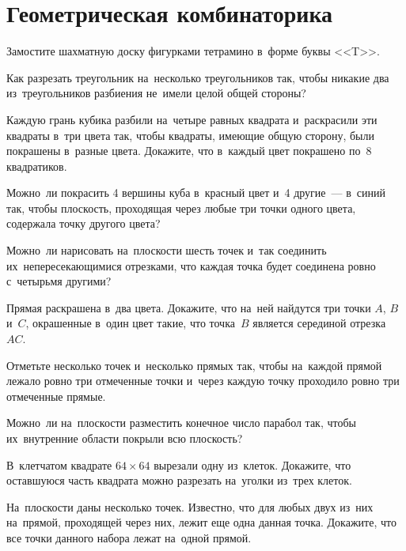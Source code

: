 
\section*{Геометрическая комбинаторика}


\begin{problems}

\item
Замостите шахматную доску фигурками тетрамино в~форме буквы <<\textsf{T}>>.

\item
Как разрезать треугольник на~несколько треугольников так, чтобы никакие два
из~треугольников разбиения не~имели целой общей стороны?

\item
Каждую грань кубика разбили на~четыре равных квадрата и~раскрасили эти квадраты
в~три цвета так, чтобы квадраты, имеющие общую сторону, были покрашены в~разные
цвета.
Докажите, что в~каждый цвет покрашено по~8 квадратиков.

\item
Можно~ли покрасить 4 вершины куба в~красный цвет и~4 другие~--- в~синий так,
чтобы плоскость, проходящая через любые три точки одного цвета, содержала точку
другого цвета?

\item
Можно~ли нарисовать на~плоскости шесть точек и~так соединить
их~непересекающимися отрезками, что каждая точка будет соединена ровно
с~четырьмя другими?

\item
Прямая раскрашена в~два цвета.
Докажите, что на~ней найдутся три точки $A$, $B$ и~$C$, окрашенные в~один цвет
такие, что точка~$B$ является серединой отрезка~$AC$.

\item
Отметьте несколько точек и~несколько прямых так, чтобы на~каждой прямой лежало
ровно три отмеченные точки и~через каждую точку проходило ровно три отмеченные
прямые.

\item
Можно~ли на~плоскости разместить конечное число парабол так, чтобы
их~внутренние области покрыли всю плоскость?

\item
В~клетчатом квадрате $64 \times 64$ вырезали одну из~клеток.
Докажите, что оставшуюся часть квадрата можно разрезать на~уголки из~трех
клеток.

\item
На~плоскости даны несколько точек.
Известно, что для любых двух из~них на~прямой, проходящей через них, лежит еще 
одна данная точка.
Докажите, что все точки данного набора лежат на~одной прямой.

\end{problems}

